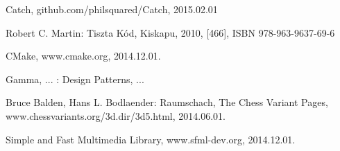 \documentclass[12pt, twoside]{report}
\begin{document}
\begin{thebibliography}{Catch}
	 Catch, github.com/philsquared/Catch, 2015.02.01
			
	 Robert C. Martin: Tiszta Kód, Kiskapu, 2010, [466], ISBN 978-963-9637-69-6

	 CMake, www.cmake.org, 2014.12.01.
	
	 Gamma, ... : Design Patterns, ...
	
	 Bruce Balden, Hans L. Bodlaender: Raumschach, The Chess Variant Pages, www.chessvariants.org/3d.dir/3d5.html, 2014.06.01.
		
	 Simple and Fast Multimedia Library, www.sfml-dev.org, 2014.12.01.
\end{thebibliography}
\end{document}
